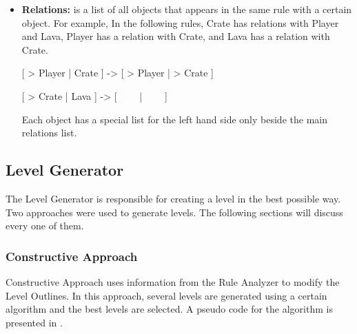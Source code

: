 \begin{itemize}
	\begin{center}
		[ > Crate | Crate ] -> [ > Crate | > Crate ]
	\end{center}
	The Crate object appeared in both rules. The first rule the Crate object appeared once, while the second rule it appeared twice. This means the minimum number of Crates is 2. Create rules are responsible for generating objects. The Minimum Number of Create objects is updated to reflect the least number of appearances in the Create rules. For example the following rules have two Create rules (the first and the third).
	\begin{center}
		[ > Player | \ \ \ \ ] -> [ Crate | Player ]
	\end{center}
	\begin{center}
		[ > Crate | Crate ] -> [ > Crate | > Crate ]
	\end{center}
	\begin{center}
		[ Gem | Crate | Gem ] -> [ Crate | Crate | Crate ]
	\end{center}
	The number of Crate objects in each rule are 0, 2, 1 respectively. In normal case, the minimum number of Crate object will be 2. Since Crate object have Create behavior then the minimum number of objects will be zero instead.
	\item \textbf{Relations:} is a list of all objects that appears in the same rule with a certain object. For example, In the following rules, Crate has relations with Player and Lava, Player has a relation with Crate, and Lava has a relation with Crate.
	\begin{center}
		[ > Player | Crate ] -> [ > Player | > Crate ]
	\end{center}
	\begin{center}
		[ > Crate | Lava ] -> [ \ \ \ \ | \ \ \ \ ]
	\end{center}
	Each object has a special list for the left hand side only beside the main relations list.	
\end{itemize}
\subsection{Level Generator}
The Level Generator is responsible for creating a level in the best possible way. Two approaches were used to generate levels. The following sections will discuss every one of them.
\subsubsection{Constructive Approach}
Constructive Approach uses information from the Rule Analyzer to modify the Level Outlines. In this approach, several levels are generated using a certain algorithm and the best levels are selected. A pseudo code for the algorithm is presented in .\\

